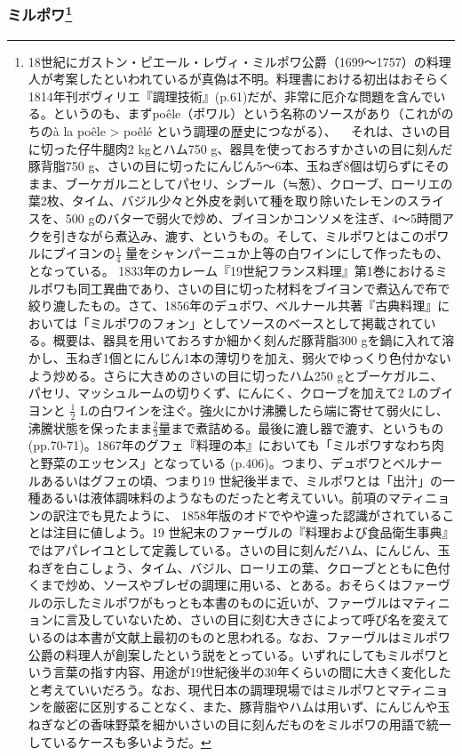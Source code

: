 \begin{recette}
\atoaki{}

\hypertarget{mirepoix}{%
\subsubsection[ミルポワ]{\texorpdfstring{ミルポワ\footnote{18世紀にガストン・ピエール・レヴィ・ミルポワ公爵（1699〜1757）の料理人が考案したといわれているが真偽は不明。料理書における初出はおそらく1814年刊ボヴィリエ『調理技術』(p.61)だが、非常に厄介な問題を含んでいる。というのも、まずpoêle（ポワル）という名称のソースがあり（これがのちのà
  la poêle \textgreater{} poêlé という調理の歴史につながる）、 ~
  それは、さいの目に切った仔牛腿肉2 kgとハム750
  g、器具を使っておろすかさいの目に刻んだ豚背脂750
  g、さいの目に切ったにんじん5〜6本、玉ねぎ8個は切らずにそのまま、ブーケガルニとしてパセリ、シブール（≒葱）、クローブ、ローリエの葉2枚、タイム、バジル少々と外皮を剥いて種を取り除いたレモンのスライスを、500
  gのバターで弱火で炒め、ブイヨンかコンソメを注ぎ、4〜5時間アクを引きながら煮込み、漉す、というもの。そして、ミルポワとはこのポワルにブイヨンの\(\frac{1}{4}\)
  量をシャンパーニュか上等の白ワインにして作ったもの、となっている。
  1833年のカレーム『19世紀フランス料理』第1巻におけるミルポワも同工異曲であり、さいの目に切った材料をブイヨンで煮込んで布で絞り漉したもの。さて、1856年のデュボワ、ベルナール共著『古典料理』においては「ミルポワのフォン」としてソースのベースとして掲載されている。概要は、器具を用いておろすか細かく刻んだ豚背脂300
  gを鍋に入れて溶かし、玉ねぎ1個とにんじん1本の薄切りを加え、弱火でゆっくり色付かないよう炒める。さらに大きめのさいの目に切ったハム250
  gとブーケガルニ、パセリ、マッシュルームの切りくず、にんにく、クローブを加えて2
  Lのブイヨンと \(\frac{1}{2}\)
  Lの白ワインを注ぐ。強火にかけ沸騰したら端に寄せて弱火にし、沸騰状態を保ったまま\(\frac{2}{3}\)量まで煮詰める。最後に漉し器で漉す、というもの(pp.70-71)。1867年のグフェ『料理の本』においても「ミルポワすなわち肉と野菜のエッセンス」となっている
  (p.406)。つまり、デュボワとベルナールあるいはグフェの頃、つまり19
  世紀後半まで、ミルポワとは「出汁」の一種あるいは液体調味料のようなものだったと考えていい。前項のマティニョンの訳注でも見たように、
  1858年版のオドでやや違った認識がされていることは注目に値しよう。19
  世紀末のファーヴルの『料理および食品衛生事典』ではアパレイユとして定義している。さいの目に刻んだハム、にんじん、玉ねぎを白こしょう、タイム、バジル、ローリエの葉、クローブとともに色付くまで炒め、ソースやブレゼの調理に用いる、とある。おそらくはファーヴルの示したミルポワがもっとも本書のものに近いが、ファーヴルはマティニョンに言及していないため、さいの目に刻む大きさによって呼び名を変えているのは本書が文献上最初のものと思われる。なお、ファーヴルはミルポワ公爵の料理人が創案したという説をとっている。いずれにしてもミルポワという言葉の指す内容、用途が19世紀後半の30年くらいの間に大きく変化したと考えていいだろう。なお、現代日本の調理現場ではミルポワとマティニョンを厳密に区別することなく、また、豚背脂やハムは用いず、にんじんや玉ねぎなどの香味野菜を細かいさいの目に刻んだものをミルポワの用語で統一しているケースも多いようだ。}}{ミルポワ}}\label{mirepoix}}


\end{recette}

